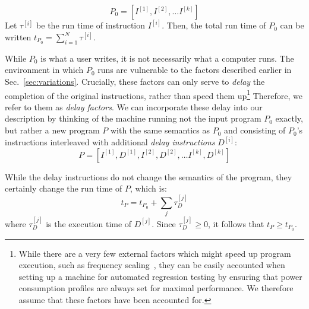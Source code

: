 \documentclass[conference]{IEEEtran}
\begin{document}
\begin{equation}
    P_0 = \left[I^{[1]}, I^{[2]}, \dots I^{[k]}\right]
\end{equation}
%
Let $\tau^{[i]}$ be the run time of instruction $I^{[i]}$. Then, the total run
time of $P_0$ can be written $t_{P_0} = \sum_{i=1}^N \tau^{[i]}$.

While $P_0$ is what a user writes, it is not necessarily what a computer runs.
The environment in which $P_0$ runs are vulnerable to the factors described
earlier in Sec.~\ref{sec:variations}. Crucially, these factors can only serve
to \textit{delay} the completion of the original instructions, rather than
speed them up\footnote{While there are a very few external factors which might
speed up program execution, such as frequency scaling~\cite{RHEL6}, they can be
easily accounted when setting up a machine for automated regression testing by
ensuring that power consumption profiles are always set for maximal
performance. We therefore assume that these factors have been accounted for.}
Therefore, we refer to them as \textit{delay factors}.  We can incorporate
these delay into our description by thinking of the machine running not the
input program $P_0$ exactly, but rather a new program $P$ with the same
semantics as $P_0$ and consisting of $P_0$'s instructions interleaved with
additional \textit{delay instructions} $D^{[i]}$:
%
\begin{equation}
    P = \left[I^{[1]}, D^{[1]}, I^{[2]}, D^{[2]}, \dots I^{[k]}, D^{[k]}\right]
\end{equation}

While the delay instructions do not change the semantics of the program, they certainly change the run time of $P$, which is:
%
\begin{equation}
    t_P = t_{P_0} + \sum_{j} \tau^{[j]}_D
\end{equation}
%
where $\tau^{[j]}_D$ is the execution time of $D^{[j]}$.
Since $\tau^{[j]}_D \ge 0$, it follows that $t_P \ge t_{P_0}$.
\end{document}
